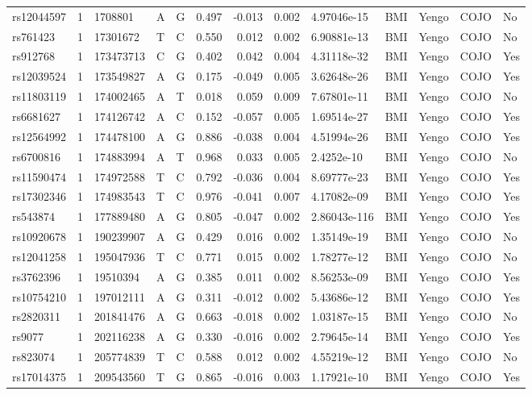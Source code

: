 \documentclass[11pt,twoside]{bristolthesis}
\begin{document}
\begin{longtable}[t]{lrlllrrrlllll}
rs12044597 & 1 & 1708801 & A & G & 0.497 & -0.013 & 0.002 & 4.97046e-15 & BMI & Yengo & COJO & No\\
rs761423 & 1 & 17301672 & T & C & 0.550 & 0.012 & 0.002 & 6.90881e-13 & BMI & Yengo & COJO & No\\
rs912768 & 1 & 173473713 & C & G & 0.402 & 0.042 & 0.004 & 4.31118e-32 & BMI & Yengo & COJO & Yes\\
rs12039524 & 1 & 173549827 & A & G & 0.175 & -0.049 & 0.005 & 3.62648e-26 & BMI & Yengo & COJO & Yes\\
\addlinespace
rs11803119 & 1 & 174002465 & A & T & 0.018 & 0.059 & 0.009 & 7.67801e-11 & BMI & Yengo & COJO & No\\
rs6681627 & 1 & 174126742 & A & C & 0.152 & -0.057 & 0.005 & 1.69514e-27 & BMI & Yengo & COJO & Yes\\
rs12564992 & 1 & 174478100 & A & G & 0.886 & -0.038 & 0.004 & 4.51994e-26 & BMI & Yengo & COJO & Yes\\
rs6700816 & 1 & 174883994 & A & T & 0.968 & 0.033 & 0.005 & 2.4252e-10 & BMI & Yengo & COJO & No\\
rs11590474 & 1 & 174972588 & T & C & 0.792 & -0.036 & 0.004 & 8.69777e-23 & BMI & Yengo & COJO & Yes\\
\addlinespace
rs17302346 & 1 & 174983543 & T & C & 0.976 & -0.041 & 0.007 & 4.17082e-09 & BMI & Yengo & COJO & Yes\\
rs543874 & 1 & 177889480 & A & G & 0.805 & -0.047 & 0.002 & 2.86043e-116 & BMI & Yengo & COJO & Yes\\
rs10920678 & 1 & 190239907 & A & G & 0.429 & 0.016 & 0.002 & 1.35149e-19 & BMI & Yengo & COJO & No\\
rs12041258 & 1 & 195047936 & T & C & 0.771 & 0.015 & 0.002 & 1.78277e-12 & BMI & Yengo & COJO & No\\
rs3762396 & 1 & 19510394 & A & G & 0.385 & 0.011 & 0.002 & 8.56253e-09 & BMI & Yengo & COJO & Yes\\
\addlinespace
rs10754210 & 1 & 197012111 & A & G & 0.311 & -0.012 & 0.002 & 5.43686e-12 & BMI & Yengo & COJO & Yes\\
rs2820311 & 1 & 201841476 & A & G & 0.663 & -0.018 & 0.002 & 1.03187e-15 & BMI & Yengo & COJO & No\\
rs9077 & 1 & 202116238 & A & G & 0.330 & -0.016 & 0.002 & 2.79645e-14 & BMI & Yengo & COJO & Yes\\
rs823074 & 1 & 205774839 & T & C & 0.588 & 0.012 & 0.002 & 4.55219e-12 & BMI & Yengo & COJO & No\\
rs17014375 & 1 & 209543560 & T & G & 0.865 & -0.016 & 0.003 & 1.17921e-10 & BMI & Yengo & COJO & Yes\\

\end{longtable}
\end{document}
